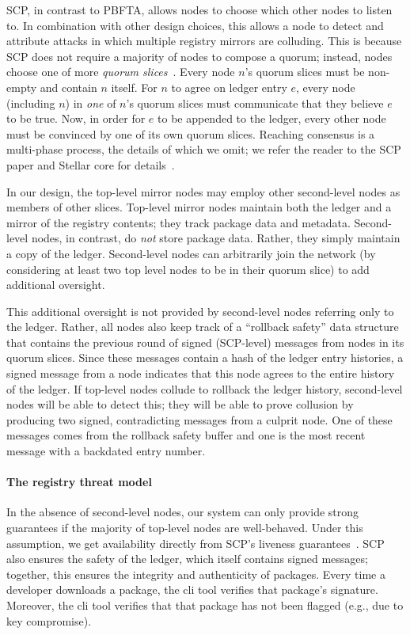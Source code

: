 SCP, in contrast to PBFTA, allows nodes to choose which other nodes to listen to. 
In combination with other design choices, this allows a node to detect and
attribute attacks in which multiple registry mirrors are colluding.
This is because SCP does not require a majority of nodes to compose a quorum;
instead, nodes choose one of more \emph{quorum slices}~\cite{stellar}.
Every node $n$'s quorum slices must be non-empty and contain $n$ itself.
For $n$ to agree on ledger entry $e$, every node (including $n$) in \emph{one} of
$n$'s quorum slices must communicate that they believe $e$ to be
true. Now, in order for $e$ to be appended to the
ledger, every other node must be convinced by one of its own quorum slices.
Reaching consensus is a multi-phase process, the details of which we omit;
we refer the reader to the SCP paper and Stellar core for details~\cite{stellar,core}.

In our design, the top-level mirror nodes may employ other
second-level nodes as members of other slices. Top-level mirror nodes maintain both
the ledger and a mirror of the registry contents; they track package data and metadata. 
Second-level nodes, in contrast, do \emph{not} store package data.
Rather, they simply maintain a copy of the ledger. Second-level nodes can arbitrarily
join the network (by considering at least two top level nodes to be in their
quorum slice) to add additional oversight.

This additional oversight is not provided by second-level nodes referring
only to the ledger. Rather, all nodes also keep track of a ``rollback safety''
data structure that contains the previous round of signed (SCP-level) messages from nodes in its quorum
slices. Since these messages contain a hash of the ledger entry histories, a signed
message from a node indicates that this node agrees to the entire history of the
ledger. If top-level nodes collude to rollback the ledger history, second-level nodes
will be able to detect this; they will be able to prove collusion by producing
two signed, contradicting messages from a culprit node. One of these messages
comes from the rollback safety buffer and one is the most recent message with
a backdated entry number. 

\paragraph{The registry threat model}
In the absence of second-level nodes, our system can only provide strong
guarantees if the majority of top-level nodes are well-behaved. Under
this assumption, we get availability directly from SCP's liveness
guarantees~\cite{stellar}. SCP also ensures the safety of the ledger,
which itself contains signed messages; together, this ensures the integrity
and authenticity of packages.
Every time a developer downloads a package, the \spam{} cli tool verifies that
package's signature. Moreover, the \spam{} cli tool verifies that that package
has not been flagged (e.g., due to key compromise). 

